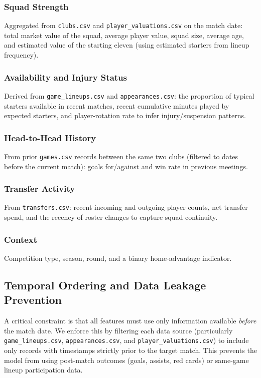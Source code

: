 \documentclass{article}
\begin{document}
\subsubsection{Squad Strength}
Aggregated from \texttt{clubs.csv} and \texttt{player\_valuations.csv} on the match date: total market value of the squad, average player value, squad size, average age, and estimated value of the starting eleven (using estimated starters from lineup frequency).

\subsubsection{Availability and Injury Status}
Derived from \texttt{game\_lineups.csv} and \texttt{appearances.csv}: the proportion of typical starters available in recent matches, recent cumulative minutes played by expected starters, and player-rotation rate to infer injury/suspension patterns.

\subsubsection{Head-to-Head History}
From prior \texttt{games.csv} records between the same two clubs (filtered to dates before the current match): goals for/against and win rate in previous meetings.

\subsubsection{Transfer Activity}
From \texttt{transfers.csv}: recent incoming and outgoing player counts, net transfer spend, and the recency of roster changes to capture squad continuity.

\subsubsection{Context}
Competition type, season, round, and a binary home-advantage indicator.

\subsection{Temporal Ordering and Data Leakage Prevention}

A critical constraint is that all features must use only information available \emph{before} the match date. We enforce this by filtering each data source (particularly \texttt{game\_lineups.csv}, \texttt{appearances.csv}, and \texttt{player\_valuations.csv}) to include only records with timestamps strictly prior to the target match. This prevents the model from using post-match outcomes (goals, assists, red cards) or same-game lineup participation data.
\end{document}
